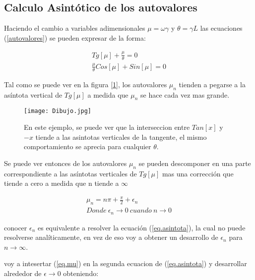 \subsection{Calculo Asintótico de los autovalores}


Haciendo el cambio a variables adimensionales $\mu = \omega \gamma $ y $\theta = \gamma L $ las ecuaciones (\ref{autovalores}) se pueden expresar de la forma:

\begin{equation}
\begin{array}{c}
    Tg[\mu] + \frac{\mu}{\theta} = 0 \\
    \frac{\mu}{\theta} Cos[\mu] + Sin[\mu] = 0
\end{array}
\label{eq.asintota}
\end{equation}

Tal como se puede ver en la figura [\ref{fig:Dibujo}], los autovalores $\mu _n$ tienden a pegarse a la asíntota vertical de $ Tg [ \mu ] $ a medida que $\mu _n$ se hace cada vez mas grande.

\begin{figure}
    \centering
    \texttt{[image: Dibujo.jpg]}
    \caption{En este ejemplo, se puede ver que la interseccion entre $Tan[x]$ y $-x$ tiende a las asintotas verticales de la tangente, el mismo comportamiento se aprecia para cualquier $ \theta $.}
    \label{fig:Dibujo}
\end{figure}

Se puede ver entonces de los autovalores $\mu _n$ se pueden descomponer en una parte correspondiente a las asíntotas verticales de $Tg[\mu]$ mas una corrección que tiende a cero a medida que n tiende a $\infty$

\begin{equation}
\begin{array}{c}
    \mu _n = n \pi + \frac{\pi}{2} + \epsilon _n \\
    Donde \ \epsilon _n \rightarrow{0}  \ cuando \ n \rightarrow{0}
\end{array}
\label{eq.mu}
\end{equation}


conocer $\epsilon _n $ es equivalente a resolver la ecuación (\ref{eq.asintota}), la cual no puede resolverse analíticamente, en vez de eso voy a obtener un desarrollo de $\epsilon _n $ para $n \rightarrow \infty$.

voy a intesertar (\ref{eq.mu}) en la segunda ecuacion de (\ref{eq.asintota}) y desarrollar alrededor de $\epsilon \rightarrow{0}$ obteniendo:

